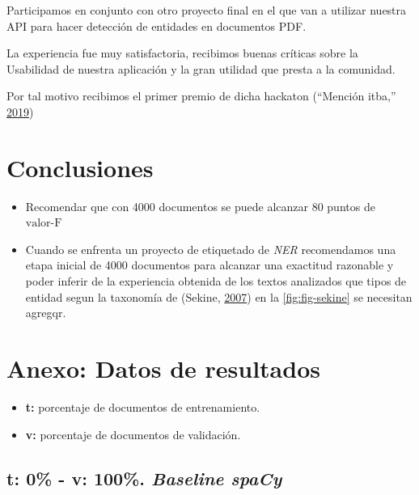 \documentclass[12pt,a4paper,]{scrartcl}
\providecommand{\tightlist}{%
  \setlength{\itemsep}{0pt}\setlength{\parskip}{0pt}}
\begin{document}
Participamos en conjunto con otro proyecto final en el que van a utilizar nuestra API para hacer detección de entidades en documentos PDF.

La experiencia fue muy satisfactoria, recibimos buenas críticas sobre la Usabilidad de nuestra aplicación y la gran utilidad que presta a la comunidad.

Por tal motivo recibimos el primer premio de dicha hackaton (``Mención itba,'' \protect\hyperlink{ref-mediaparty2019_win}{2019})

\newpage

\hypertarget{conclusiones}{%
\section{Conclusiones}\label{conclusiones}}

\begin{itemize}
\item
  Recomendar que con 4000 documentos se puede alcanzar 80 puntos de \(\text{valor-F}\)
\item
  Cuando se enfrenta un proyecto de etiquetado de \emph{NER} recomendamos una etapa inicial de 4000 documentos para alcanzar una exactitud razonable y poder inferir de la experiencia obtenida de los textos analizados que tipos de entidad segun la taxonomía de (Sekine, \protect\hyperlink{ref-Sekine-NER}{2007}) en la \ref{fig:fig-sekine} se necesitan agregqr.
\end{itemize}

\newpage

\hypertarget{anexo-datos-de-resultados}{%
\section*{Anexo: Datos de resultados}\label{anexo-datos-de-resultados}}

\begin{itemize}
\tightlist
\item
  \textbf{t:} porcentaje de documentos de entrenamiento.
\item
  \textbf{v:} porcentaje de documentos de validación.
\end{itemize}

\hypertarget{t-0---v-100.-baseline-spacy}{%
\subsection{\texorpdfstring{t: 0\% - v: 100\%. \emph{Baseline spaCy}}{t: 0\% - v: 100\%. Baseline spaCy}}\label{t-0---v-100.-baseline-spacy}}
\end{document}
